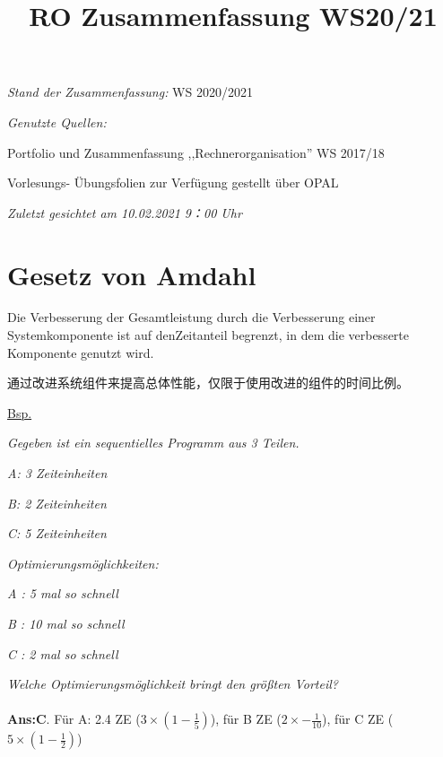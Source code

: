 \documentclass[fleqn]{article}
\title{RO Zusammenfassung WS20/21}
\begin{document}
\maketitle

\newpage

\textit{Stand der Zusammenfassung:} WS 2020/2021

\textit{Genutzte Quellen:} 

\indent\indent Portfolio und Zusammenfassung ,,Rechnerorganisation'' WS 2017/18

\indent\indent Vorlesungs- Übungsfolien zur Verfügung gestellt über OPAL

\textit{Zuletzt gesichtet am 10.02.2021 9：00 Uhr} 

\newpage

\tableofcontents

\pagestyle{main}

\newpage

\section{Gesetz von Amdahl}

Die Verbesserung der Gesamtleistung durch die Verbesserung einer Systemkomponente ist auf denZeitanteil begrenzt, in dem die verbesserte Komponente genutzt wird.

通过改进系统组件来提高总体性能，仅限于使用改进的组件的时间比例。

\noindent \underline{Bsp.}

\noindent \textit{Gegeben ist ein sequentielles Programm aus 3 Teilen.}

\textit{A: 3 Zeiteinheiten}

\textit{B: 2 Zeiteinheiten}

\textit{C: 5 Zeiteinheiten}

\noindent \textit{Optimierungsmöglichkeiten:}

\textit{A : 5 mal so schnell}

\textit{B : 10 mal so schnell}

\textit{C : 2 mal so schnell}

\noindent\textit{Welche Optimierungsmöglichkeit bringt den größten Vorteil?}
\\
\\
\textbf{Ans:C}. Für A: 2.4 ZE ($3\times(1-\frac{1}{5})$), für B ZE ($2\times-\frac{1}{10}$), für C ZE ($5\times(1-\frac{1}{2})$)
\end{document}
